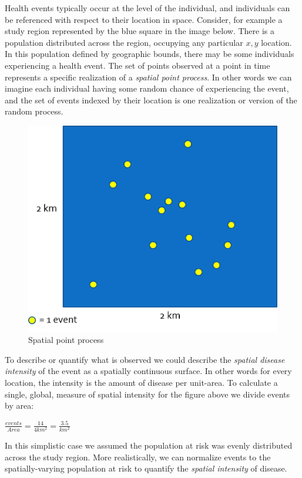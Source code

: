 \documentclass[
]{book}
\begin{document}
Health events typically occur at the level of the individual, and individuals can be referenced with respect to their location in space. Consider, for example a study region represented by the blue square in the image below. There is a population distributed across the region, occupying any particular \(x,y\) location. In this population defined by geographic bounds, there may be some individuals experiencing a health event. The set of points observed at a point in time represents a specific realization of a \emph{spatial point process}. In other words we can imagine each individual having some random chance of experiencing the event, and the set of events indexed by their location is one realization or version of the random process.

\begin{figure}
\centering
\includegraphics{images/point-process.png}
\caption{\label{fig:unnamed-chunk-66}Spatial point process}
\end{figure}

To describe or quantify what is observed we could describe the \emph{spatial disease intensity} of the event as a spatially continuous surface. In other words for every location, the intensity is the amount of disease per unit-area. To calculate a single, global, measure of spatial intensity for the figure above we divide events by area:

\(\frac{events}{Area}=\frac{14}{4km^{2}}=\frac{3.5}{km^{2}}\)

In this simplistic case we assumed the population at risk was evenly distributed across the study region. More realistically, we can normalize events to the spatially-varying population at risk to quantify the \emph{spatial intensity} of disease.
\end{document}
